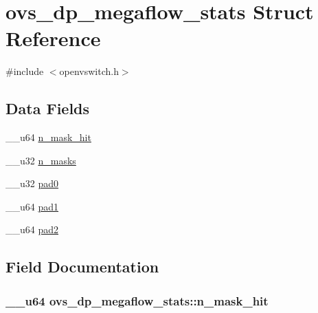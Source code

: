 \hypertarget{structovs__dp__megaflow__stats}{}\section{ovs\+\_\+dp\+\_\+megaflow\+\_\+stats Struct Reference}
\label{structovs__dp__megaflow__stats}


{\ttfamily \#include $<$openvswitch.\+h$>$}

\subsection*{Data Fields}
\begin{DoxyCompactItemize}
\item 
\+\_\+\+\_\+u64 \hyperlink{structovs__dp__megaflow__stats_a28566425278d53e7a93e693d54e1e65c}{n\+\_\+mask\+\_\+hit}
\item 
\+\_\+\+\_\+u32 \hyperlink{structovs__dp__megaflow__stats_a7984504a5c12cc5a0767c6a34c4c9c96}{n\+\_\+masks}
\item 
\+\_\+\+\_\+u32 \hyperlink{structovs__dp__megaflow__stats_a958a20791b4e74e2be231c1b82dd9268}{pad0}
\item 
\+\_\+\+\_\+u64 \hyperlink{structovs__dp__megaflow__stats_a2cd7b88cd84316721a2dfafc7040b99a}{pad1}
\item 
\+\_\+\+\_\+u64 \hyperlink{structovs__dp__megaflow__stats_a321ac1dbc76c153d6dd969ad929dea75}{pad2}
\end{DoxyCompactItemize}


\subsection{Field Documentation}
\hypertarget{structovs__dp__megaflow__stats_a28566425278d53e7a93e693d54e1e65c}{}
\subsubsection[{n\+\_\+mask\+\_\+hit}]{\setlength{\rightskip}{0pt plus 5cm}\+\_\+\+\_\+u64 ovs\+\_\+dp\+\_\+megaflow\+\_\+stats\+::n\+\_\+mask\+\_\+hit}\label{structovs__dp__megaflow__stats_a28566425278d53e7a93e693d54e1e65c}
\hypertarget{structovs__dp__megaflow__stats_a7984504a5c12cc5a0767c6a34c4c9c96}{}

